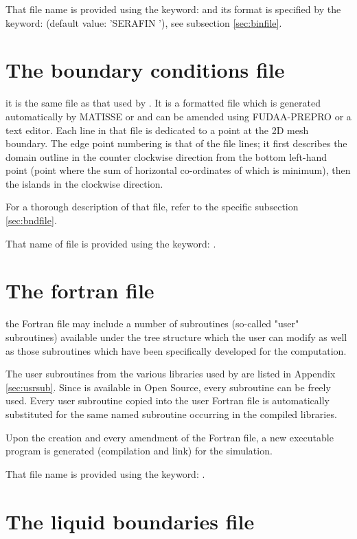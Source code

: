 That file name is provided using the keyword:  and its
format is specified by the keyword:  (default
value: 'SERAFIN '), see subsection \ref{sec:binfile}.


\section{The boundary conditions file}

it is the same file as that used by . It is a formatted file which is
generated automatically by MATISSE or \stbtel and can be amended
using FUDAA-PREPRO or a text editor. Each line in that file is
dedicated to a point at the 2D mesh boundary. The edge point numbering is that
of the file lines; it first describes the domain outline in the counter
clockwise direction from the bottom left-hand point (point where the sum of
horizontal co-ordinates of which is minimum), then the islands in the clockwise
direction.

For a thorough description of that file, refer to the specific subsection
\ref{sec:bndfile}.

That name of file is provided using the keyword: .


\section{The fortran file}

the Fortran file may include a number of subroutines (so-called "user"
subroutines) available under the  tree structure which the user can
modify as well as those subroutines which have been specifically developed for
the computation.

The user subroutines from the various libraries used by  are listed
in Appendix \ref{sec:usrsub}. Since  is available in Open Source, every
subroutine can be freely used. Every user subroutine copied into the user
Fortran file is automatically substituted for the same named subroutine
occurring in the  compiled libraries.

Upon the creation and every amendment of the Fortran file, a new executable
program is generated (compilation and link) for the simulation.

That file name is provided using the keyword: .


\section{The liquid boundaries file}


